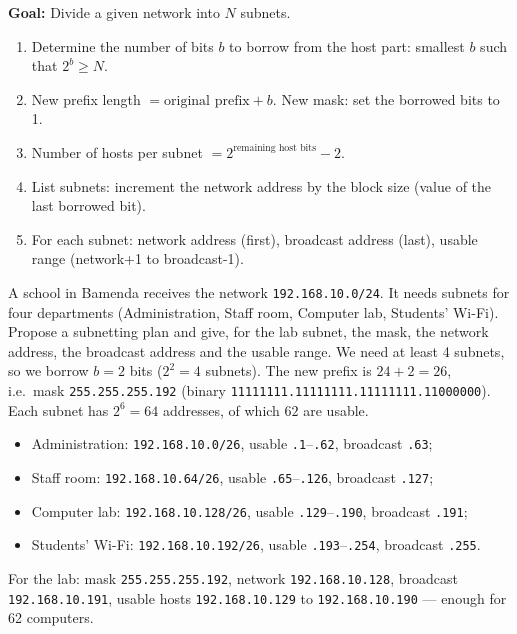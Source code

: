 \documentclass[11pt]{article}
\begin{document}
\begin{methode}
\textbf{Goal:} Divide a given network into $N$ subnets.
\begin{enumerate}
\item Determine the number of bits $b$ to borrow from the host part: smallest $b$ such that $2^b \ge N$.
\item New prefix length $= \text{original prefix} + b$. New mask: set the borrowed bits to 1.
\item Number of hosts per subnet $= 2^{\text{remaining host bits}} - 2$.
\item List subnets: increment the network address by the block size (value of the last borrowed bit).
\item For each subnet: network address (first), broadcast address (last), usable range (network+1 to broadcast-1).
\end{enumerate}
\end{methode}

\begin{exoresolu}
A school in Bamenda receives the network \texttt{192.168.10.0/24}. It needs subnets for four departments (Administration, Staff room, Computer lab, Students' Wi-Fi). Propose a subnetting plan and give, for the lab subnet, the mask, the network address, the broadcast address and the usable range.
\tcblower
We need at least 4 subnets, so we borrow $b=2$ bits ($2^2 = 4$ subnets). The new prefix is $24 + 2 = 26$, i.e.\ mask \texttt{255.255.255.192} (binary \texttt{11111111.11111111.11111111.11000000}). Each subnet has $2^6 = 64$ addresses, of which $62$ are usable.
\begin{itemize}
\item Administration: \texttt{192.168.10.0/26}, usable \texttt{.1}--\texttt{.62}, broadcast \texttt{.63};
\item Staff room: \texttt{192.168.10.64/26}, usable \texttt{.65}--\texttt{.126}, broadcast \texttt{.127};
\item Computer lab: \texttt{192.168.10.128/26}, usable \texttt{.129}--\texttt{.190}, broadcast \texttt{.191};
\item Students' Wi-Fi: \texttt{192.168.10.192/26}, usable \texttt{.193}--\texttt{.254}, broadcast \texttt{.255}.
\end{itemize}
For the lab: mask \texttt{255.255.255.192}, network \texttt{192.168.10.128}, broadcast \texttt{192.168.10.191}, usable hosts \texttt{192.168.10.129} to \texttt{192.168.10.190} --- enough for 62 computers.
\end{exoresolu}
\end{document}
